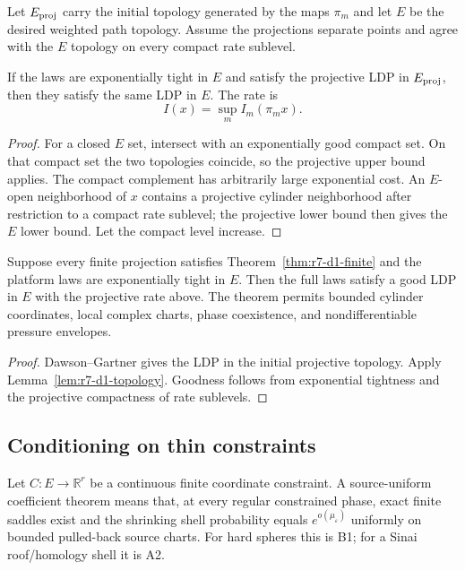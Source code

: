 Let $E_{\rm proj}$ carry the initial topology generated by the maps $\pi_m$ and
let $E$ be the desired weighted path topology.  Assume the projections separate
points and agree with the $E$ topology on every compact rate sublevel.

\begin{lemma}
\label{lem:r7-d1-topology}
If the laws are exponentially tight in $E$ and satisfy the projective LDP in
$E_{\rm proj}$, then they satisfy the same LDP in $E$.  The rate is
\[
 I(x)=\sup_m I_m(\pi_mx).
\]
\end{lemma}

\begin{proof}
For a closed $E$ set, intersect with an exponentially good compact set.  On
that compact set the two topologies coincide, so the projective upper bound
applies.  The compact complement has arbitrarily large exponential cost.  An
$E$-open neighborhood of $x$ contains a projective cylinder neighborhood after
restriction to a compact rate sublevel; the projective lower bound then gives
the $E$ lower bound.  Let the compact level increase.
\end{proof}

\begin{theorem}
\label{thm:r7-d1-projective}
Suppose every finite projection satisfies
Theorem~\ref{thm:r7-d1-finite} and the platform laws are exponentially tight in
$E$.  Then the full laws satisfy a good LDP in $E$ with the projective rate
above.  The theorem permits bounded cylinder coordinates, local complex
charts, phase coexistence, and nondifferentiable pressure envelopes.
\end{theorem}

\begin{proof}
Dawson--Gartner gives the LDP in the initial projective topology.  Apply
Lemma~\ref{lem:r7-d1-topology}.  Goodness follows from exponential tightness and
the projective compactness of rate sublevels.
\end{proof}

\subsection{Conditioning on thin constraints}

Let $C:E\to\mathbb R^r$ be a continuous finite coordinate constraint.  A
source-uniform coefficient theorem means that, at every regular constrained
phase, exact finite saddles exist and the shrinking shell probability equals
$e^{o(\mu_\varepsilon)}$ uniformly on bounded pulled-back source charts.  For
hard spheres this is B1; for a Sinai roof/homology shell it is A2.

